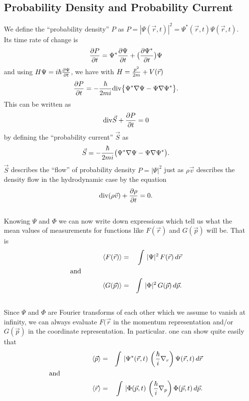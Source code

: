  \subsection{Probability Density and Probability Current}
 We define the ``probability density'' $P$ as $P = |\Psi(\vec{r},t)|^2 = \Psi^*(\vec{r},t) \Psi(\vec{r},t)$. Its time rate of change is 
 $${\partial P\over \partial t} = \Psi^*{\partial \Psi\over \partial t} + \big( {\partial \Psi^*\over \partial t} \big)\Psi$$and using 
 $H\Psi = i\hbar {\partial \Psi\over \partial t}$,  we have with $H = {p^2\over 2m} + V(\vec{r})$
 $${\partial P\over \partial t} = -{\hbar\over2m i} \hbox{div}\big\{\Psi^*\nabla \Psi - \Psi \nabla\Psi^* \big\}.$$This can be written as
 $$\hbox{div}\vec{S} + {\partial P\over \partial t} = 0$$by defining the ``probability current'' $\vec{S}$ as
 $$\vec{S} = -{\hbar\over2m i} \big(\Psi^*\nabla \Psi - \Psi \nabla\Psi^* \big).$$$\vec{S}$ describes the ``flow'' of probability density $P=|\Psi|^2$ just as
 $\rho \vec{v}$ describes the density flow in the hydrodynamic case by the equation
 $$\hbox{div}(\rho\vec{v}) + {\partial \rho\over \partial t} = 0.$$\\
  Knowing $\Psi$ and $\Phi$ we can now write down expressions which tell us what the mean values of measurements for functions like
 $F(\vec{r})$ and $G(\vec{p})$ will be. That is 
 \begin{eqnarray*}
  \langle F(\vec{r})\rangle  &=& \int  \, |\Psi|^2\, F(\vec{r})\,d\vec{r} \\ 
  \hbox{and~~~~~~~~~~~~~~~~~~\hfill} &\null&\\
  \langle G(\vec{p})\rangle  &=& \int  \, |\Phi|^2\, G(\vec{p})\,d\vec{p}.
 \end{eqnarray*}\\
 
 Since $\Psi$ and $\Phi$ are Fourier transforms of each other which we assume to vanish at infinity, we can always evaluate $F(\vec{r}$ in the momentum representation and/or $G(\vec{p})$ in the coordinate representation. In particular. one can show quite easily that 
  \begin{eqnarray*}
  \langle \vec{p}\rangle  &=& \int  \, |\Psi^*(\vec{r},t)\, \left( {\hbar\over i} \nabla_r\right) \Psi(\vec{r},t)\,d\vec{r}\\
  \hbox{and~~~~~~~~~~~~~~~~~~\hfill} &\null&\\
  \langle \vec{r}\rangle  &=& \int  \, |\Phi(\vec{p},t)\, \left( {\hbar\over i} \nabla_p\right) \Phi(\vec{p},t)\,d\vec{p}. 
 \end{eqnarray*}\\


